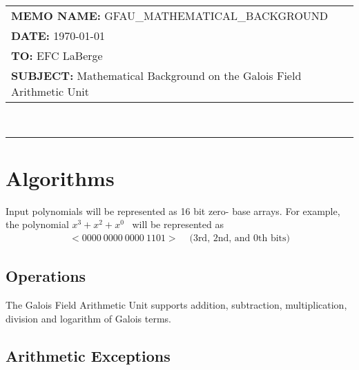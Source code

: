 \documentclass[11pt]{extarticle}
\newcommand{\examplepoly}{$x^{3}+x^{2}+x^{0}$}
\newcommand{\documentinfo}[4]{
    \begin{centering}
        \parbox{2in}{
        \begin{spacing}{1}
            \begin{flushleft}
                \begin{tabular}{l l} #1 \\ #2 \\ #3 \\ #4 \\
                \end{tabular} \\
                \rule{\textwidth}{1pt}
            \end{flushleft}
        \end{spacing} }
    \end{centering} }
\begin{document}
    \documentinfo
    {\textbf{MEMO NAME:} GFAU\_MATHEMATICAL\_BACKGROUND}
    {\textbf{DATE:} \today}
    {\textbf{TO:} EFC LaBerge}
    {\textbf{SUBJECT: } Mathematical Background on the Galois Field Arithmetic
    Unit}
    \vspace{-0.1in}

    

    \section{Algorithms} Input polynomials will be represented as 16 bit zero-
    base arrays. For example, the polynomial \examplepoly~ will be represented
    as
        \begin{equation*}
            \begin{split}
                <0000 \ 0000 \ 0000 \ 1101> & \text{  (3rd, 2nd, and 0th bits)}
            \end{split}
        \end{equation*}

        

        
        \subsection{Operations} The Galois Field Arithmetic Unit supports
        addition, subtraction, multiplication, division and logarithm of Galois
        terms.

        
        
        
        

        \subsection{Arithmetic Exceptions}

        
        

        
        
\end{document}
